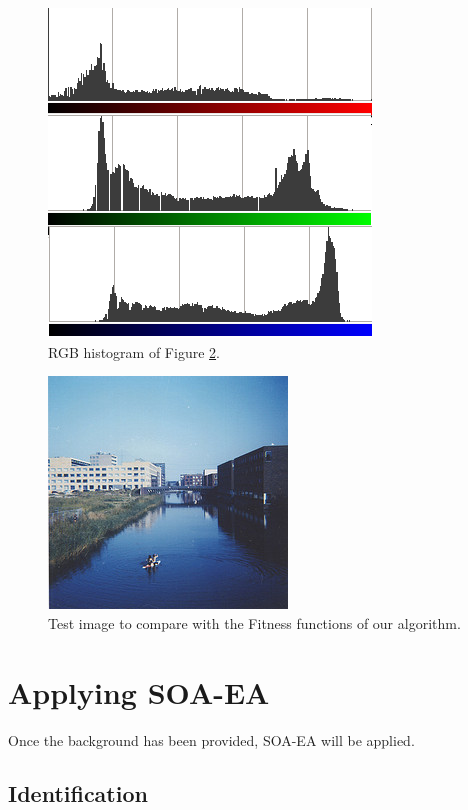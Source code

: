 \begin{figure}
\centering
   \includegraphics[scale =0.6] {gfx/art/histogram.png}
\caption{RGB histogram of Figure \ref{fig:flevopark}. }
\label{fig:histogram}
\end{figure}

\begin{figure}
\centering
   \includegraphics[scale =3] {gfx/art/flevopark.jpg}
\caption{Test image to compare with the Fitness functions of our algorithm.}
\label{fig:flevopark}
\end{figure}


\section{Applying SOA-EA}
\label{sec:art:soaea}

Once the background has been provided, SOA-EA will be applied.

\subsection{Identification}

